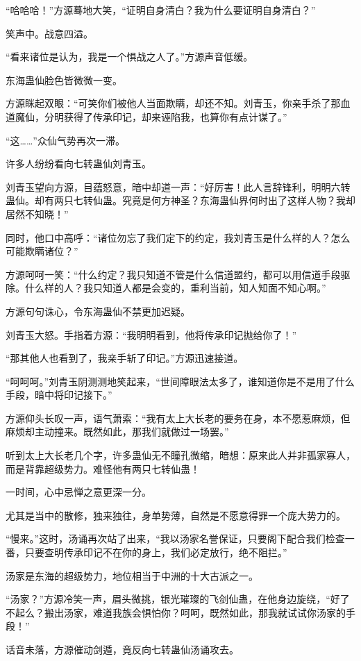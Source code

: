 \begin{this_body}
“哈哈哈！”方源蓦地大笑，“证明自身清白？我为什么要证明自身清白？”

笑声中。战意四溢。

“看来诸位是认为，我是一个惧战之人了。”方源声音低缓。

东海蛊仙脸色皆微微一变。

方源眯起双眼：“可笑你们被他人当面欺瞒，却还不知。刘青玉，你亲手杀了那血道魔仙，分明获得了传承印记，却来诬陷我，也算你有点计谋了。”

“这……”众仙气势再次一滞。

许多人纷纷看向七转蛊仙刘青玉。

刘青玉望向方源，目蕴怒意，暗中却道一声：“好厉害！此人言辞锋利，明明六转蛊仙。却有两只七转仙蛊。究竟是何方神圣？东海蛊仙界何时出了这样人物？我却居然不知晓！”

同时，他口中高呼：“诸位勿忘了我们定下的约定，我刘青玉是什么样的人？怎么可能欺瞒诸位？”

方源呵呵一笑：“什么约定？我只知道不管是什么信道盟约，都可以用信道手段驱除。什么样的人？我只知道人都是会变的，重利当前，知人知面不知心啊。”

方源句句诛心，令东海蛊仙不禁更加迟疑。

刘青玉大怒。手指着方源：“我明明看到，他将传承印记抛给你了！”

“那其他人也看到了，我亲手斩了印记。”方源迅速接道。

“呵呵呵。”刘青玉阴测测地笑起来，“世间障眼法太多了，谁知道你是不是用了什么手段，暗中将印记接下。”

方源仰头长叹一声，语气萧索：“我有太上大长老的要务在身，本不愿惹麻烦，但麻烦却主动撞来。既然如此，那我们就做过一场罢。”

听到太上大长老几个字，许多蛊仙无不瞳孔微缩，暗想：原来此人并非孤家寡人，而是背靠超级势力。难怪他有两只七转仙蛊！

一时间，心中忌惮之意更深一分。

尤其是当中的散修，独来独往，身单势薄，自然是不愿意得罪一个庞大势力的。

“慢来。”这时，汤诵再次站了出来，“我以汤家名誉保证，只要阁下配合我们检查一番，只要查明传承印记不在你的身上，我们必定放行，绝不阻拦。”

汤家是东海的超级势力，地位相当于中洲的十大古派之一。

“汤家？”方源冷笑一声，眉头微挑，银光璀璨的飞剑仙蛊，在他身边旋绕，“好了不起么？搬出汤家，难道我族会惧怕你？呵呵，既然如此，那我就试试你汤家的手段！”

话音未落，方源催动剑遁，竟反向七转蛊仙汤诵攻去。


\end{this_body}
